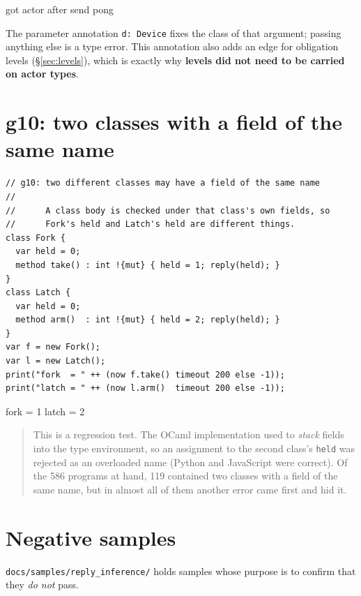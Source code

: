 \documentclass[11pt,a4paper]{article}
\begin{document}
\begin{term}
got actor
after send
pong
\end{term}

The parameter annotation \texttt{d: Device} fixes the class of that argument;
passing anything else is a type error. This annotation also adds an edge for
obligation levels (\S\ref{sec:levels}), which is exactly why \textbf{levels did
not need to be carried on actor types}.

\section{g10: two classes with a field of the same name}

\begin{lstlisting}
// g10: two different classes may have a field of the same name
//
//      A class body is checked under that class's own fields, so
//      Fork's held and Latch's held are different things.
class Fork {
  var held = 0;
  method take() : int !{mut} { held = 1; reply(held); }
}
class Latch {
  var held = 0;
  method arm()  : int !{mut} { held = 2; reply(held); }
}
var f = new Fork();
var l = new Latch();
print("fork  = " ++ (now f.take() timeout 200 else -1));
print("latch = " ++ (now l.arm()  timeout 200 else -1));
\end{lstlisting}

\begin{term}
fork  = 1
latch = 2
\end{term}

\begin{quote}\small
This is a regression test. The OCaml implementation used to \emph{stack} fields
into the type environment, so an assignment to the second class's \texttt{held}
was rejected as an overloaded name (Python and JavaScript were correct). Of the
586 programs at hand, 119 contained two classes with a field of the same name,
but in almost all of them another error came first and hid it.
\end{quote}

\section{Negative samples}

\texttt{docs/samples/reply\_inference/} holds samples whose purpose is to
confirm that they \emph{do not} pass.
\end{document}
